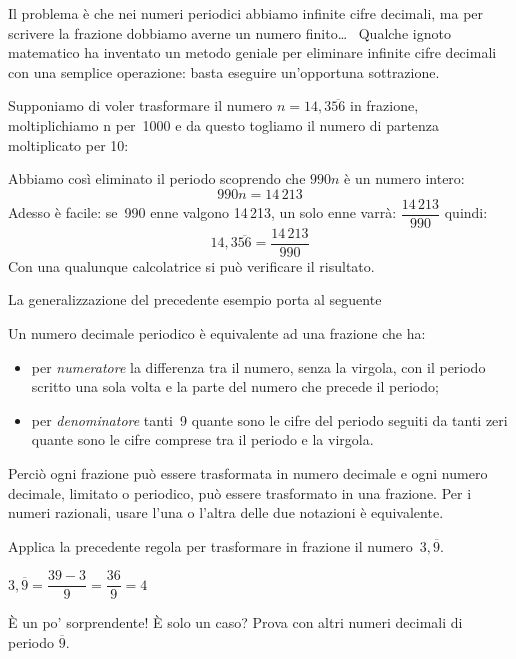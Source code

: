 Il problema è che nei numeri periodici abbiamo infinite cifre decimali, ma 
per scrivere la frazione dobbiamo averne un numero finito\dots~ 
Qualche ignoto matematico ha inventato un metodo geniale per eliminare 
infinite cifre decimali con una semplice operazione: basta eseguire 
un'opportuna sottrazione.

Supponiamo di voler trasformare il numero \(n = 14,3\overline{56}\) in 
frazione, moltiplichiamo n per~1000 e da questo togliamo il numero di 
partenza moltiplicato per 10:

{\sottrazioneraz}

Abbiamo così eliminato il periodo scoprendo che \(990n\) è un numero 
intero:
\[990n = 14\,213\]
Adesso è facile: se~990 enne valgono 14\,213, un solo enne varrà:
\(\dfrac{14\,213}{990}\)
quindi:
\[14,3\overline{56} = \frac{14\,213}{990}\]
Con una qualunque calcolatrice si può verificare il risultato.

\medskip
La generalizzazione del precedente esempio porta al 
seguente

\begin{teorema}{}{}
 Un numero decimale periodico è equivalente ad 
una frazione che ha:
\begin{itemize}
\item per \emph{numeratore} la differenza tra il numero, senza la virgola, 
con il periodo scritto una sola volta e la parte del numero che precede 
il periodo;
\item per \emph{denominatore} tanti~9 quante sono le cifre del periodo 
seguiti da tanti zeri quante sono le cifre comprese tra il periodo e la 
virgola.
\end{itemize}
\end{teorema}

Perciò ogni frazione può essere trasformata in 
numero decimale e ogni numero decimale, limitato o periodico, può essere 
trasformato in una frazione. 
Per i numeri razionali, usare l'una o l'altra delle due 
notazioni è equivalente.

\begin{osservazione}{}{}
Applica la precedente regola per trasformare in frazione il 
numero~\(3,\overline{9}\). 

\(3,\overline{9} = \dfrac{39 - 3}{9} = \dfrac{36}{9} = 4\)
\end{osservazione}

\noindent È un po' sorprendente! È solo un caso?
Prova con altri numeri decimali di periodo \(\overline{9}\).

